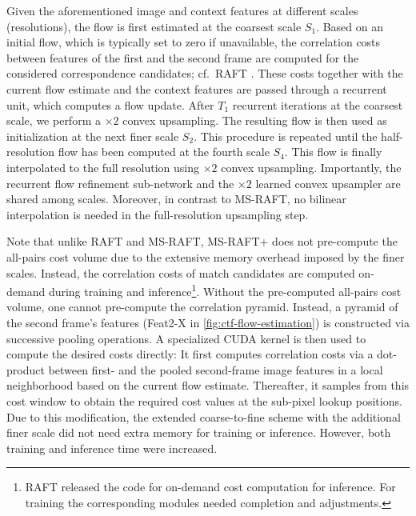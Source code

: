 \documentclass[conference,compsoc,a4paper]{IEEEtran}[2015/08/26]
\begin{document}
Given the aforementioned image and context features at different scales (resolutions), the flow is first estimated at the coarsest scale $S_1$. Based on an initial flow, which is typically set to zero if unavailable, the correlation costs between features of the first and the second frame are computed for the considered correspondence candidates;
cf.\ RAFT \cite{Teed2020_RAFT}.
These costs together with the current flow estimate and the context features are passed through a recurrent unit, which computes a flow update. After $T_1$ recurrent iterations at the coarsest scale, we perform a $\times 2$ convex upsampling. The resulting flow is then used as initialization at the next finer scale $S_2$. This procedure is repeated until the half-resolution flow has been computed at the fourth scale $S_4$. This flow is finally interpolated to the full resolution using $\times 2$ convex upsampling.
Importantly, the recurrent flow refinement sub-network and the $\times 2$ learned convex upsampler are shared among scales. Moreover, in contrast to MS-RAFT, no bilinear interpolation is needed in the full-resolution upsampling step.

Note that unlike RAFT and MS-RAFT, MS-RAFT+ does not pre-compute the all-pairs cost volume due to the extensive memory overhead imposed by the finer scales. Instead, the correlation costs of match candidates are computed on-demand during training and inference\footnote{RAFT \cite{Teed2020_RAFT} released the code for on-demand cost computation for inference. For training the corresponding modules needed completion and adjustments.}. 
Without the pre-computed all-pairs cost volume, one cannot pre-compute the correlation pyramid.
Instead, a pyramid of the second frame's features (Feat2-X in \cref{fig:ctf-flow-estimation}) is constructed via successive pooling operations.
A specialized CUDA kernel is then used to compute the desired costs directly:
It first computes correlation costs via a dot-product between first- and the pooled second-frame image features in a local neighborhood based on the current flow estimate.
Thereafter, it samples from this cost window to obtain the required cost values at the sub-pixel lookup positions.
Due to this modification, the extended coarse-to-fine scheme 
with the additional finer scale did not need extra memory for training or inference. However, both training and inference time were increased.
\end{document}
